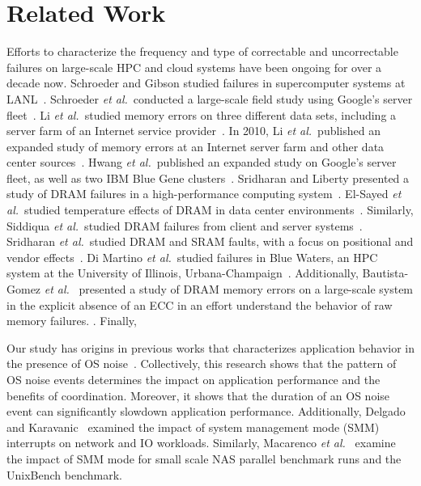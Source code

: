 
\section{Related Work}
\label{sec:related}



Efforts to characterize the frequency and type of correctable and uncorrectable
failures on large-scale HPC and cloud systems have been ongoing for over a
decade now.  Schroeder and Gibson studied failures in supercomputer systems at
LANL~\cite{Schroeder:2006:Large-scale}.  Schroeder {\it et al.}~conducted a
large-scale field study using Google's server fleet~\cite{Schroeder09}.  Li {\it
et al.}~studied memory errors on three different data sets, including a server
farm of an Internet service provider~\cite{Li07}.  In 2010, Li {\it et
al.}~published an expanded study of memory errors at an Internet server farm and
other data center sources~\cite{Li10}.  Hwang {\it et al.}~published an expanded
study on Google's server fleet, as well as two IBM Blue Gene
clusters~\cite{Hwang12}.  Sridharan and Liberty presented a study of DRAM
failures in a high-performance computing system~\cite{Sridharan12}.  El-Sayed
{\it et al.}~studied temperature effects of DRAM in data center
environments~\cite{Elsayed12}.  Similarly, Siddiqua {\it et al.}~studied DRAM
failures from client and server systems~\cite{Siddiqua13}.  Sridharan {\it et
al.}~studied DRAM and SRAM faults, with a focus on positional and vendor
effects~\cite{Sridharan13}.  Di Martino {\it et al.}~studied failures in Blue
Waters, an HPC system at the University of Illinois,
Urbana-Champaign~\cite{bluewaters}.  Additionally, Bautista-Gomez {\it et
al.}~\cite{Bautista-Gomez:2016:Unprotected} presented a study of DRAM memory
errors on a large-scale system in the explicit absence of an ECC in an effort
understand the behavior of raw memory failures. .
Finally, 

Our study has origins in previous works that characterizes application behavior
in the presence of OS
noise~\cite{Ferreira:2008:Characterizing,Hoefler:2010:Characterizing}.
Collectively, this research shows that the pattern of OS noise events determines
the impact on application performance and the benefits of coordination.
Moreover, it shows that the duration of an OS noise event can significantly
slowdown application performance.  Additionally, Delgado and
Karavanic~\cite{Delgado:2013:SMM} examined the impact of system management mode
(SMM) interrupts on network and IO workloads.  Similarly, Macarenco {\it et
al.}~\cite{Macarenco:2016:Effects} examine the impact of SMM mode for small
scale NAS parallel benchmark runs and the UnixBench benchmark.


